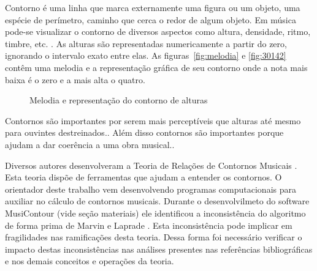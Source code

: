 \documentclass[11pt]{article}
\begin{document}
Contorno é uma linha que marca externamente uma figura ou um objeto,
uma espécie de perímetro, caminho que cerca o redor de
algum objeto. Em música pode-se visualizar o contorno de
diversos aspectos como altura, densidade, ritmo, timbre, etc.
\cite[p. 01]{Sampaio2008}. As alturas são representadas numericamente
a partir do zero, ignorando o intervalo exato entre elas. As
figuras~\ref{fig:melodia} e \ref{fig:30142} contêm uma melodia e a
representação gráfica de seu contorno onde a nota mais baixa é o zero
e a mais alta o quatro.

\begin{figure}[h]
  \centering
  \caption{Melodia e representação do contorno de alturas}
  \label{fig:melodia-representacao}
\end{figure}

Contornos são importantes por serem mais perceptíveis que alturas até
mesmo para ouvintes destreinados.\cite[p. 225]{Marvin1987}.
Além disso contornos são importantes porque ajudam
a dar coerência a uma obra musical.\cite[p. 225]{Clifford1995}.

Diversos autores desenvolveram a Teoria de Relações de Contornos
Musicais \cite{Friedmann1985, Friedmann1987, Morris1987, Marvin1987,
  Marvin1988, Polansky1992, Morris1993, Clifford1995, Quinn1997,
  Beard2003, Sampaio2008, Schultz2008, Schultz2009, Bor2009}. Esta
teoria dispõe de ferramentas que ajudam a entender os contornos. O
orientador deste trabalho vem desenvolvendo programas computacionais
para auxiliar no cálculo de contornos musicais. Durante o
desenvolvilmeto do software
MusiContour (vide seção materiais) ele identificou a inconsistência
do algoritmo de forma prima de Marvin e Laprade \cite{Marvin1987}.
Esta inconsistência pode implicar em fragilidades nas ramificações
desta teoria.
Dessa forma foi necessário verificar o
impacto destas inconsistências nas análises presentes nas referências
bibliográficas e nos demais conceitos e operações da teoria.
\end{document}
